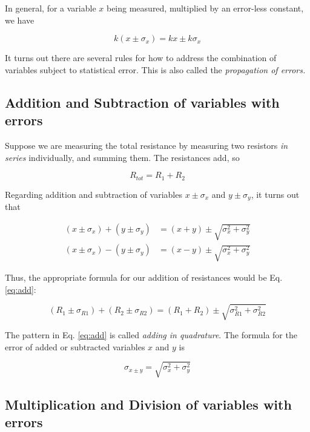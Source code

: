 \documentclass[12pt]{article}
\begin{document}
In general, for a variable $x$ being measured, multiplied by an error-less constant, we have

\begin{equation}
k(x\pm \sigma_x) = kx \pm k\sigma_x
\end{equation}

It turns out there are several rules for how to address the combination of variables subject to statistical error.  This is also called the \textit{propagation of errors.}

\subsection{Addition and Subtraction of variables with errors}

Suppose we are measuring the total resistance by measuring two resistors \textit{in series} individually, and summing them.  The resistances add, so

\begin{equation}
R_{tot} = R_1 + R_2
\end{equation}

Regarding addition and subtraction of variables $x\pm \sigma_x$ and $y\pm \sigma_y$, it turns out that

\begin{align}
(x\pm \sigma_x) + (y\pm \sigma_y) &= (x+y) \pm \sqrt{\sigma_x^2 + \sigma_y^2} \label{eq:add} \\
(x\pm \sigma_x) - (y\pm \sigma_y) &= (x-y) \pm \sqrt{\sigma_x^2 + \sigma_y^2}
\end{align}

Thus, the appropriate formula for our addition of resistances would be Eq. \ref{eq:add}:

\begin{equation}
(R_{1} \pm \sigma_{R1}) + (R_{2} \pm \sigma_{R2}) = (R_{1}+R_{2}) \pm \sqrt{\sigma_{R1}^2 + \sigma_{R2}^2}
\end{equation}

The pattern in Eq. \ref{eq:add} is called \textit{adding in quadrature}.  The formula for the error of added or subtracted variables $x$ and $y$ is

\begin{equation}
\sigma_{x\pm y} = \sqrt{\sigma_x^2 + \sigma_y^2}
\end{equation}

\subsection{Multiplication and Division of variables with errors}
\end{document}
